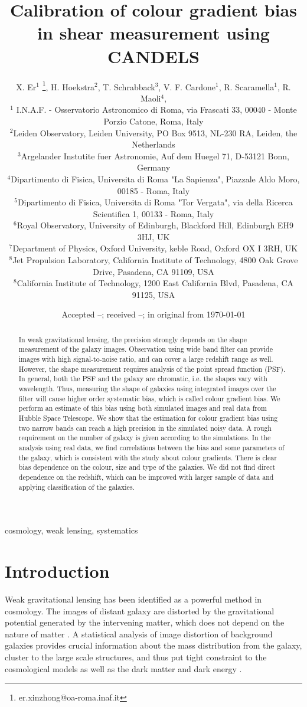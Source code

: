 \documentclass[useAMS,usenatbib]{mn2e}
\title[Colour gradient bias]
{Calibration of colour gradient bias in shear measurement using CANDELS}
\author[Xer et al.]%
{
X. Er$^1$ \thanks{er.xinzhong@oa-roma.inaf.it},
H. Hoekstra$^2$, T. Schrabback$^3$, V. F. Cardone$^1$, R. Scaramella$^1$, R. Maoli$^4$,
\newauthor{M. Vicinanza$^{1,4,5}$, B. Gillis$^{6}$ L. Miller$^{7}$, J. Rhodes$^{8,9}$}
\\
$^1$ I.N.A.F. - Osservatorio Astronomico di Roma, via Frascati 33, 00040 - Monte Porzio Catone, Roma, Italy\\
$^2$Leiden Observatory, Leiden University, PO Box 9513, NL-230 RA, Leiden, the Netherlands \\
$^3$Argelander Instutite fuer Astronomie, Auf dem Huegel 71, D-53121 Bonn, Germany\\
$^4$Dipartimento di Fisica, Universita di Roma "La Sapienza", Piazzale Aldo Moro, 00185 - Roma, Italy\\
$^5$Dipartimento di Fisica, Universita di Roma "Tor Vergata", via della Ricerca Scientifica 1, 00133 - Roma, Italy\\
$^6$Royal Observatory, University of Edinburgh, Blackford Hill, Edinburgh EH9 3HJ, UK\\
$^7$Department of Physics, Oxford University, keble Road, Oxford OX I 3RH, UK\\
$^8$Jet Propulsion Laboratory, California Institute of Technology, 4800 Oak Grove Drive, Pasadena, CA 91109, USA\\
$^8$California Institute of Technology, 1200 East California Blvd, Pasadena, CA 91125, USA
}
\date{Accepted --;  received --;  in original from \today}
\begin{document}
\maketitle

\begin{abstract}
  In weak gravitational lensing, the precision strongly depends on
  the shape measurement of the galaxy images. Observation using wide
  band filter can provide images with high signal-to-noise ratio, and
  can cover a large redshift range as well. However, the shape
  measurement requires analysis of the point spread function
  (PSF). In general, both the PSF and the galaxy are chromatic,
  i.e. the shapes vary with wavelength. Thus, measuring the shape of
  galaxies using integrated images over the filter will cause higher
  order systematic bias, which is called colour gradient bias.
  We perform an estimate of this bias using both simulated images and
  real data from Hubble Space Telescope. We show that the estimation
  for colour gradient bias using two narrow bands can reach a high
  precision in the simulated noisy data. A rough requirement on the
  number of galaxy is given according to the simulations. In the
  analysis using real data, we find correlations between the bias and
  some parameters of the galaxy, which is consistent with the study
  about colour gradients. There is clear bias dependence on the
  colour, size and type of the galaxies. We did not find direct
  dependence on the redshift, which can be improved with larger sample
  of data and applying classification of the galaxies.

\end{abstract}
\begin{keywords} cosmology, weak lensing, systematics
\end{keywords}


\section{Introduction}

Weak gravitational lensing has been identified as a powerful method in
cosmology. The images of distant galaxy are distorted by the
gravitational potential generated by the intervening matter, which
does not depend on the nature of matter
\citep[e.g.][]{2001PhR...340..291B}. A statistical analysis of image
distortion of background galaxies provides crucial information about
the mass distribution from the galaxy, cluster to the large scale
structures, and thus put tight constraint to the cosmological models
as well as the dark matter and dark energy
\citep[e.g.][]{2000MNRAS.318..625B, 2000Natur.405..143W,
  2006ApJ...648L.109C, 2008ARNPS..58...99H, 2008A&A...479....9F,
  2010A&A...516A..63S, 2012ApJ...755...56U, cfhtls2013kilbinger,
  2015ApJ...806....4M}.
\end{document}
